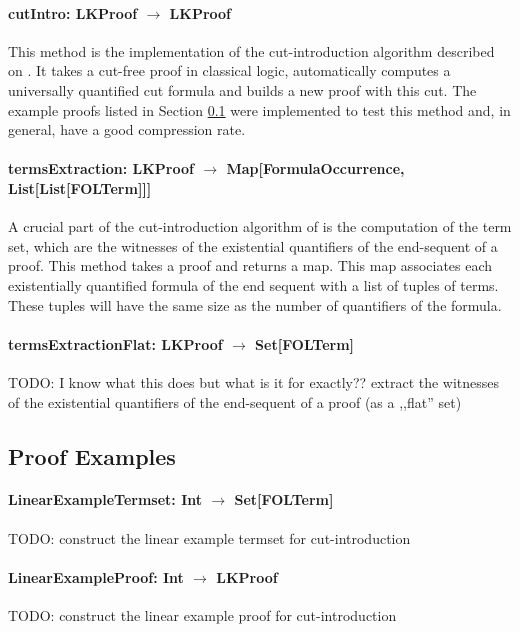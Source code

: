 \documentclass[a4paper, 11pt]{report}
\begin{document}
\paragraph{\textbf{cutIntro: LKProof $\rightarrow$ LKProof}}
This method is the implementation of the cut-introduction algorithm described on
\cite{Hetzl2012}. It takes a cut-free proof in classical logic, automatically
computes a universally quantified cut formula and builds a new proof with this
cut. The example proofs listed in Section \ref{sec:exampleproofs} were
implemented to test this method and, in general, have a good compression rate.

\paragraph{\textbf{termsExtraction: LKProof $\rightarrow$ Map[FormulaOccurrence, List[List[FOLTerm]]]}}
A crucial part of the cut-introduction algorithm of \cite{Hetzl2012} is the
computation of the term set, which are the witnesses of the existential
quantifiers of the end-sequent of a proof. This method takes a proof and returns
a map. This map associates each existentially quantified formula of the end
sequent with a list of tuples of terms. These tuples will have the same size as
the number of quantifiers of the formula.

\paragraph{\textbf{termsExtractionFlat: LKProof $\rightarrow$ Set[FOLTerm]}}
{\color{red}TODO: I know what this does but what is it for exactly??} extract
the witnesses of the existential quantifiers of the end-sequent of a proof (as a
,,flat'' set)

\subsection{Proof Examples}
\label{sec:exampleproofs}


\paragraph{\textbf{LinearExampleTermset: Int $\rightarrow$ Set[FOLTerm]}}
{\color{red}TODO}: construct the linear example termset for cut-introduction

\paragraph{\textbf{LinearExampleProof: Int $\rightarrow$ LKProof}}
{\color{red}TODO}: construct the linear example proof for cut-introduction
\end{document}
